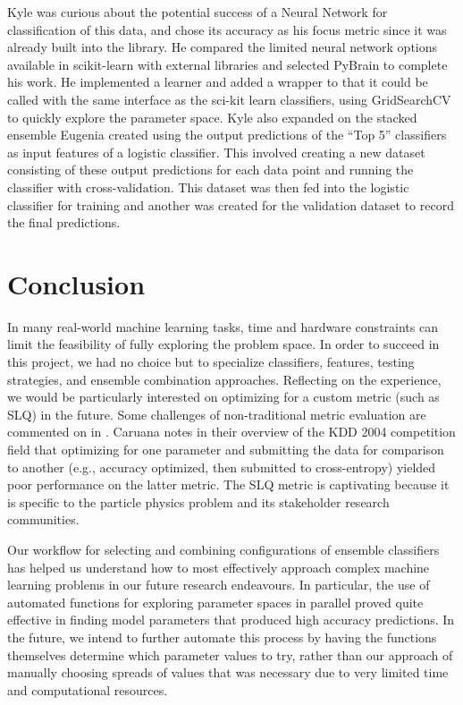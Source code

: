 \documentclass{article}
\begin{document}
Kyle was curious about the potential success of a Neural Network for classification of this data, and chose its accuracy as his focus metric since it was already built into the library. 
He compared the limited neural network options available in scikit-learn with external libraries and selected PyBrain to complete his work.
He implemented a learner and added a wrapper to that it could be called with the same interface as the sci-kit learn classifiers, using GridSearchCV to quickly explore the parameter space.
Kyle also expanded on the stacked ensemble Eugenia created using the output predictions of the ``Top 5'' classifiers as input features of a logistic classifier.
This involved creating a new dataset consisting of these output predictions for each data point and running the classifier with cross-validation.
This dataset was then fed into the logistic classifier for training and another was created for the validation dataset to record the final predictions.



\section{Conclusion}

In many real-world machine learning tasks, time and hardware constraints can limit the feasibility of fully exploring the problem space.
In order to succeed in this project, we had no choice but to specialize classifiers, features, testing strategies, and ensemble combination approaches.
Reflecting on the experience, we would be particularly interested on optimizing for a custom metric (such as SLQ) in the future.
Some challenges of non-traditional metric evaluation are commented on in \cite{vogel2004anti}.
Caruana notes in their overview of the KDD 2004 competition field \cite{caruana2004kdd} that optimizing for one parameter and submitting the data for comparison to another (e.g., accuracy optimized, then submitted to cross-entropy) yielded poor performance on the latter metric. 
The SLQ metric is captivating because it is specific to the particle physics problem and its stakeholder research communities. 

Our workflow for selecting and combining configurations of ensemble classifiers has helped us understand how to most effectively approach complex machine learning problems in our future research endeavours.
In particular, the use of automated functions for exploring parameter spaces in parallel proved quite effective in finding model parameters that produced high accuracy predictions.
In the future, we intend to further automate this process by having the functions themselves determine which parameter values to try, rather than our approach of manually choosing spreads of values that was necessary due to very limited time and computational resources.




\end{document}
